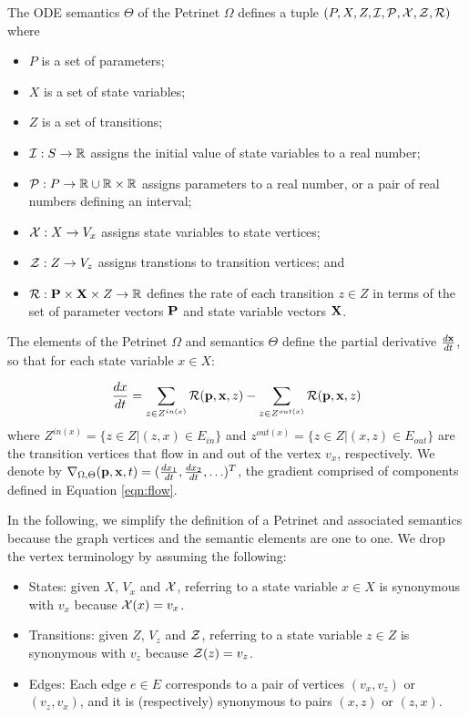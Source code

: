 \begin{definition}
	The ODE semantics $\Theta$ of the Petrinet $\Omega$ defines a tuple $(P, X,
		Z, {\cal I}, {\cal P}, {\cal X}, {\cal Z}, {\cal R})$ where
	\begin{itemize}
		\item $P$ is a set of parameters;
		\item $X$ is a set of state variables;
		\item $Z$ is a set of transitions;
		\item ${\cal I}: S \rightarrow {\mathbb{R}}$ assigns the initial value of
		      state variables to a real number;
		\item ${\cal P}: P \rightarrow {\mathbb{R}} \cup {\mathbb{R}} \times {\mathbb{R}}$ assigns
		      parameters to a real number, or a pair of real numbers defining an
		      interval;
		\item ${\cal X}: X \rightarrow V_x$ assigns state variables to state
		      vertices;
		\item ${\cal Z}: Z \rightarrow V_z$ assigns transtions to transition
		      vertices; and
		\item ${\cal R}: {\bf P} \times {\bf X} \times Z \rightarrow {\mathbb{R}}$
		      defines the rate of each transition  $z \in Z$ in terms of the set of
		      parameter vectors ${\bf P}$ and state variable vectors ${\bf X}$.
	\end{itemize}
	The elements of the Petrinet $\Omega$ and semantics $\Theta$ define the
	partial derivative $\frac{d {\bf x}}{dt}$, so that for each state variable
	$x \in X$:

	\begin{equation}\label{eqn:flow}
		\frac{dx}{dt} = \sum_{z \in Z^{in(x)}} {\cal R}({\bf p}, {\bf x}, z) - \sum_{z \in Z^{out(x)} } {\cal R}({\bf p}, {\bf x}, z)
	\end{equation}
	\noindent where $Z^{in(x)} = \{z \in Z | (z, x) \in E_{in}\}$ and
	$z^{out(x)}=\{z \in Z| (x, z) \in E_{out}\}$ are the transition
	vertices that flow in and out of the vertex $v_x$, respectively. We denote
	by $\nabla_{\Omega, \Theta}({\bf p}, {\bf x}, t) = (\frac{dx_1}{dt},
		\frac{dx_2}{dt}, \ldots)^T$, the gradient comprised of components defined in
	Equation \eqref{eqn:flow}.
\end{definition}

In the following, we simplify the definition of a Petrinet and associated
semantics because the graph vertices and the semantic elements are one to one.  We drop
the vertex terminology by assuming the following:
\begin{itemize}
	\item States: given $X$, $V_x$ and ${\cal X}$, referring to a state
	      variable $x \in X$ is synonymous with $v_x$ because ${\cal X}(x) = v_x$.
	\item Transitions: given $Z$, $V_z$ and ${\cal Z}$, referring to a state
	      variable $z \in Z$ is synonymous with $v_z$ because ${\cal Z}(z) = v_z$.
	\item Edges: Each edge $e \in E$ corresponds to a pair of vertices $(v_x,
		      v_z)$ or $(v_z, v_x)$, and it is (respectively) synonymous to pairs $(x, z)$
	      or $(z, x)$.
\end{itemize}

